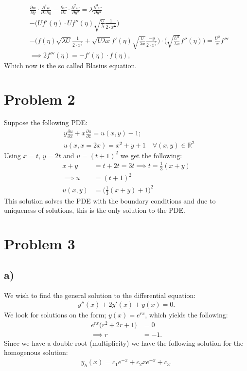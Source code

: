 \documentclass{article}
\begin{document}
\begin{align*}
    &\frac{\partial w}{\partial y}\cdot \frac{\partial^2 w}{\partial x\partial y} - \frac{\partial w}{\partial x} \cdot \frac{\partial^2w}{\partial y^2} = \lambda \frac{\partial^3 w}{\partial y^3}\\
    &-\Big(Uf'(\eta)\cdot Uf''(\eta)\sqrt{\frac{U}{\lambda}}\frac{1}{2\cdot x^{\frac{3}{2}}}\Big)\\
    &-\Big(f(\eta)\sqrt{\lambda U}\frac{1}{2\cdot x^{\frac{1}{2}}} + \sqrt{U\lambda x}f'(\eta)\sqrt{\frac{U}{\lambda x}}\frac{-y}{2\cdot x^{\frac{3}{2}}}\Big)\cdot\Bigg(\sqrt{\frac{U^3}{\lambda x}}f''(\eta)\Bigg)=\frac{U^2}{x}f'''\\
    &\implies 2f'''(\eta) = - f'(\eta)\cdot f(\eta),
\end{align*}Which now is the so called Blasius equation.

\section*{Problem 2}
Suppose the following PDE:
\begin{align*}
    &y \frac{\partial u}{\partial x} + x\frac{\partial u}{\partial z} = u(x,y) - 1;\\
    &u(x, x = 2x) =x^2 + y + 1\quad \forall (x,y)\in\mathbb{R}^2
\end{align*}
Using $x = t$, $y = 2t$ and $u = (t+1)^2$ we get the following:
\begin{align*}
    x+ y  &= t + 2t = 3t \implies t = \frac{1}{3}(x+y) \\
    \implies u &= (t+1)^2\\
    u(x,y)&=\Big(\frac{1}{3}(x+y) + 1\Big)^2
\end{align*} This solution solves the PDE with the boundary conditions and due to uniqueness of solutions, this is the only solution to the PDE. 
\section*{Problem 3}
\subsection*{a)}
We wish to find the general solution to the differential equation:
\begin{align*}
    y''(x) + 2y'(x) + y(x) = 0.
\end{align*} We look for solutions on the form; $y(x) = e^{r x}$, which yields the following:
\begin{align*}
   e^{rx} \Big(r^2 + 2r + 1\Big) &= 0\\
    \implies r &= -1.
\end{align*}Since we have a double root (multiplicity) we have the following solution for the homogenous solution:
\begin{align*}
    y_h(x) = c_1 e^{-x} + c_2 x e^{-x} + c_3.
\end{align*}
\end{document}
